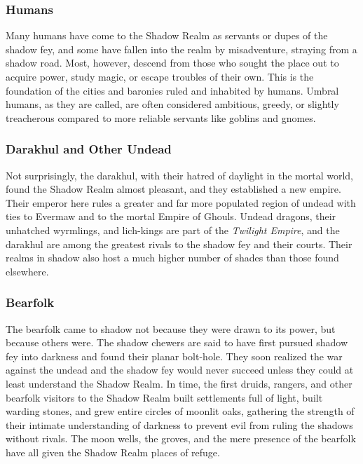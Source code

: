 \documentclass[10pt,a4paper,twoside,bg=print,twocolumn,openany,nodeprecatedcode]{dndbook}
\begin{document}
\subsubsection{Humans}
Many humans have come to the Shadow Realm as servants or dupes of the shadow fey, and some have fallen into the realm by misadventure, straying from a shadow road. Most, however, descend from those who sought the place out to acquire power, study magic, or escape troubles of their own. This is the foundation of the cities and baronies ruled and inhabited by humans. Umbral humans, as they are called, are often considered ambitious, greedy, or slightly treacherous compared to more reliable servants like goblins and gnomes.

\subsubsection{Darakhul and Other Undead}
Not surprisingly, the darakhul, with their hatred of daylight in the mortal world, found the Shadow Realm almost pleasant, and they established a new empire. Their emperor here rules a greater and far more populated region of undead with ties to Evermaw and to the mortal Empire of Ghouls. Undead dragons, their unhatched wyrmlings, and lich-kings are part of the \textit{Twilight Empire}, and the darakhul are among the greatest rivals to the shadow fey and their courts. Their realms in shadow also host a much higher number of shades than those found elsewhere.

\subsubsection{Bearfolk}
The bearfolk came to shadow not because they were drawn to its power, but because others were. The shadow chewers are said to have first pursued shadow fey into darkness and found their planar bolt-hole. They soon realized the war against the undead and the shadow fey would never succeed unless they could at least understand the Shadow Realm. In time, the first druids, rangers, and other bearfolk visitors to the Shadow Realm built settlements full of light, built warding stones, and grew entire circles of moonlit oaks, gathering the strength of their intimate understanding of darkness to prevent evil from ruling the shadows without rivals. The moon wells, the groves, and the mere presence of the bearfolk have all given the Shadow Realm places of refuge.
\end{document}
